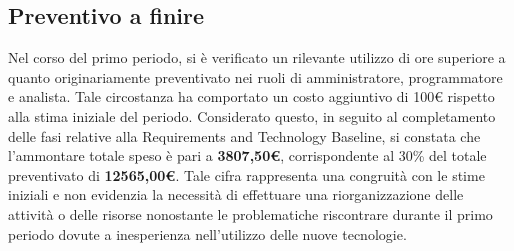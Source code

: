 \subsection{Preventivo a finire}
Nel corso del primo periodo, si è verificato un rilevante utilizzo di ore superiore a quanto originariamente preventivato nei ruoli di amministratore, programmatore e analista. Tale circostanza ha comportato un costo aggiuntivo di 100€ rispetto alla stima iniziale del periodo.
Considerato questo, in seguito al completamento delle fasi relative alla Requirements and Technology Baseline, si constata che l'ammontare totale speso è pari a \textbf{3807,50€}, corrispondente al 30\% del totale preventivato di \textbf{12565,00€}.
Tale cifra rappresenta una congruità con le stime iniziali e non evidenzia la necessità di effettuare una riorganizzazione delle attività o delle risorse nonostante le problematiche riscontrare durante il primo periodo dovute a inesperienza nell'utilizzo delle nuove tecnologie.